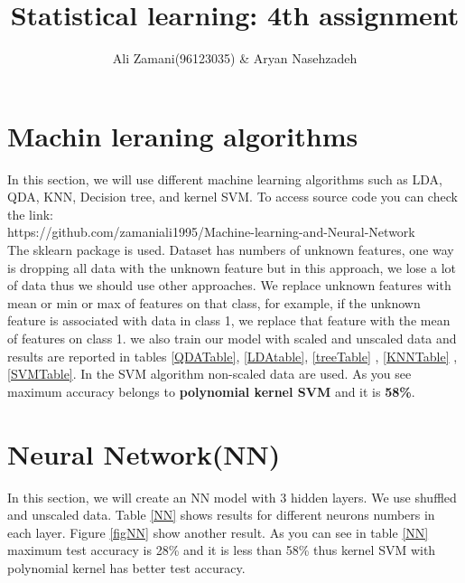 \documentclass[17pt]{article}
\title{
	{\large Statistical learning: 4th assignment}\\}
\author{Ali Zamani(96123035) \& Aryan Nasehzadeh}
\begin{document}
\maketitle

\newpage
\section{Machin leraning algorithms}
In this section, we will use different machine learning algorithms such as LDA, QDA, KNN, Decision tree, and kernel SVM. To access source code you can check the link:\\
https://github.com/zamaniali1995/Machine-learning-and-Neural-Network\\
The sklearn package is used.
Dataset has numbers of unknown features, one way is dropping all data with the unknown feature but in this approach, we lose a lot of data thus we should use other approaches. 
We replace unknown features with mean or min or max of features on that class, for example, if the unknown feature is associated with data in class 1, we replace that feature with the mean of features on class 1. we also train our model with scaled and unscaled data and results are reported in tables \ref{QDATable}, \ref{LDAtable}, \ref{treeTable} , \ref{KNNTable} , \ref{SVMTable}. In the SVM algorithm non-scaled data are used. As you see maximum accuracy belongs to \textbf{polynomial kernel SVM} and it is \textbf{58\%}.
\section{Neural Network(NN)}
In this section, we will create an NN model with 3 hidden layers. We use shuffled and unscaled data. Table \ref{NN} shows results for different neurons numbers in each layer. Figure \ref{figNN} show another result. As you can see in table \ref{NN} maximum test accuracy is 28\% and it is less than 58\% thus kernel SVM with polynomial kernel has better test accuracy.\\
\end{document}
